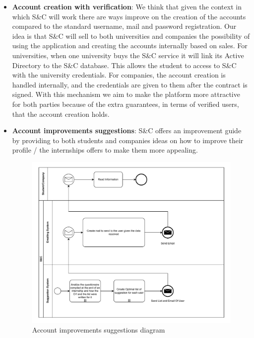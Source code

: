 \begin{itemize}
      \item \textbf{Account creation with verification}:
            We think that given the context in which S\&C will work there are ways improve on the creation of the
            accounts compared to the standard username, mail and password registration. Our idea is that S\&C will sell
            to both universities and companies the possibility of using the application and creating the accounts
            internally based on sales. For universities, when one university buys the S\&C service it will link its
            Active Directory to the S\&C database. This allows the student to access to S\&C with the university
            credentials. For companies, the account creation is handled internally, and the credentials are given to
            them after the contract is signed. With this mechanism we aim to make the platform more attractive for both
            parties because of the extra guarantees, in terms of verified users, that the account creation holds.
      \item \textbf{Account improvements suggestions}:
            S\&C offers an improvement guide by providing to both students and companies ideas on how to improve their
            profile / the internships offers to make them more appealing.

            \begin{figure}[H]
                  \centering
                  \includegraphics[width=1.0\textwidth]{Images/BPMN_2.pdf}
                  \caption{Account improvements suggestions diagram}
                  \label{fig:account_improvements_suggestions_diagram}
            \end{figure}
\end{itemize}


